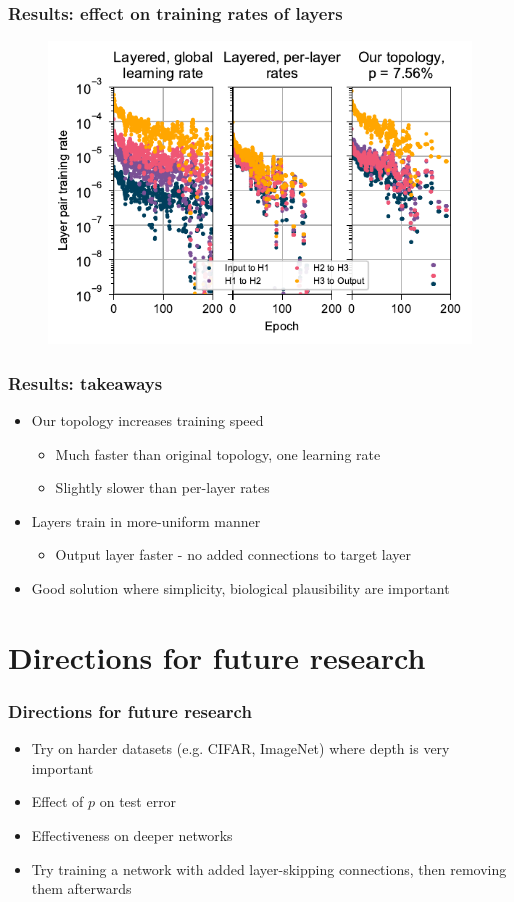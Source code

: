 \documentclass[pdf]{beamer}
\begin{document}
\begin{frame}
	\frametitle{Results: effect on training rates of layers}
	\begin{figure}
		\includegraphics[width=\textwidth]{figures/perlayer_global+original+ours.pdf}
	\end{figure}
\end{frame}

\begin{frame}
	\frametitle{Results: takeaways}
	\begin{itemize}
		\item<1-> Our topology increases training speed
		\begin{itemize}
			\item<2-> Much faster than original topology, one learning rate
			\item<3-> Slightly slower than per-layer rates
		\end{itemize}
		\item<4-> Layers train in more-uniform manner
		\begin{itemize}
			\item<5-> Output layer faster - no added connections to target layer
		\end{itemize}
		\item<6-> Good solution where simplicity, biological plausibility are important
			
	\end{itemize}
\end{frame}

\section{Directions for future research}
\begin{frame}
	\frametitle{Directions for future research}
	\begin{itemize}
		\item<1-> Try on harder datasets (e.g. CIFAR, ImageNet) where depth is very important
		\item<2-> Effect of $p$ on test error
		\item<3-> Effectiveness on deeper networks
		\item<4-> Try training a network with added layer-skipping connections, then removing them afterwards
	\end{itemize}
\end{frame}
\end{document}
